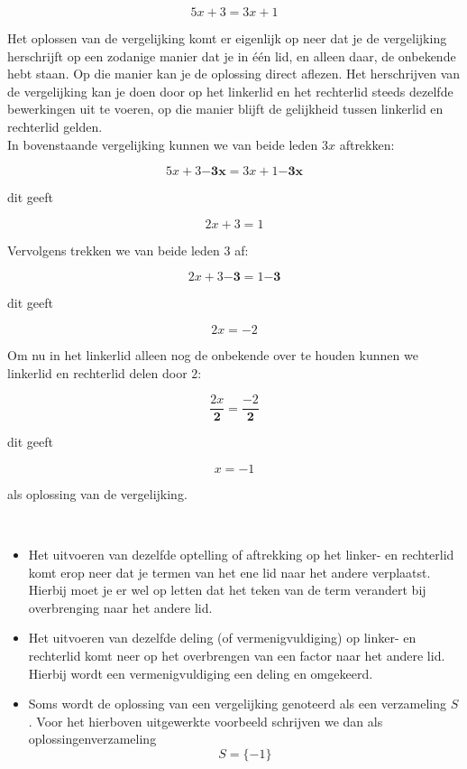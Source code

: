 \begin{voorbeeld}

\[5x+3=3x+1\]

Het oplossen van de vergelijking komt er eigenlijk op neer dat je de vergelijking herschrijft op een zodanige manier dat je in \'{e}\'{e}n lid, en alleen daar, de onbekende hebt staan. Op die manier kan je de oplossing direct aflezen.
Het herschrijven van de vergelijking kan je doen door op het linkerlid en het rechterlid steeds dezelfde bewerkingen uit te voeren, op die manier blijft de gelijkheid tussen linkerlid en rechterlid gelden.\\
In bovenstaande vergelijking kunnen we van beide leden $3x$ aftrekken:

\[ 5x+3 \boldsymbol{-3x} = 3x +1 \boldsymbol{-3x} \]

dit geeft

\[ 2x+3 = 1 \]

Vervolgens trekken we van beide leden $3$ af:

\[ 2x+3 \boldsymbol{-3} = 1 \boldsymbol{-3} \]

dit geeft

\[ 2x = -2 \]

Om nu in het linkerlid alleen nog de onbekende over te houden kunnen we linkerlid en rechterlid delen door $2$:

\[ \frac{2x}{\boldsymbol{2}} = \frac{-2}{\boldsymbol{2}} \]

dit geeft

\[ x=-1 \]

als oplossing van de vergelijking.\\

\end{voorbeeld}

\begin{opmerking}
\ \\
\begin{itemize} \item Het uitvoeren van dezelfde optelling of aftrekking op het linker- en rechterlid komt erop neer  dat je termen van het ene lid naar het andere verplaatst. Hierbij moet je er wel op letten dat het teken van de term verandert bij overbrenging naar het andere lid. \item Het uitvoeren van dezelfde deling (of vermenigvuldiging) op linker- en rechterlid komt neer op het overbrengen van een factor naar het andere lid. Hierbij wordt een vermenigvuldiging een deling en omgekeerd. \item {Soms wordt de oplossing van een vergelijking genoteerd als een verzameling $S$. Voor het hierboven uitgewerkte voorbeeld schrijven we dan als oplossingenverzameling
 \[ S=\{-1\} \] }
\end{itemize}

\end{opmerking}

